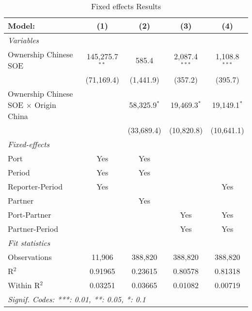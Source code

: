 \begin{table}[htbp]    \caption{Fixed effects Results}    \centering    \begin{adjustbox}{width = \textwidth, center}       \begin{tabular}{lcccc}          \tabularnewline \midrule \midrule          Model:                                       & (1)              & (2)            & (3)             & (4)\\            \midrule          \emph{Variables}\\          Ownership Chinese SOE                        & 145,275.7$^{**}$ & 585.4          & 2,087.4$^{***}$ & 1,108.8$^{***}$\\                                                          & (71,169.4)       & (1,441.9)      & (357.2)         & (395.7)\\             Ownership Chinese SOE $\times$ Origin China  &                  & 58,325.9$^{*}$ & 19,469.3$^{*}$  & 19,149.1$^{*}$\\                                                          &                  & (33,689.4)     & (10,820.8)      & (10,641.1)\\             \midrule          \emph{Fixed-effects}\\          Port                                         & Yes              & Yes            &                 & \\            Period                                       & Yes              & Yes            &                 & \\            Reporter-Period                              & Yes              &                &                 & Yes\\            Partner                                      &                  & Yes            &                 & \\            Port-Partner                                 &                  &                & Yes             & Yes\\            Partner-Period                               &                  &                & Yes             & Yes\\            \midrule          \emph{Fit statistics}\\          Observations                                 & 11,906           & 388,820        & 388,820         & 388,820\\            R$^2$                                        & 0.91965          & 0.23615        & 0.80578         & 0.81318\\            Within R$^2$                                 & 0.03251          & 0.03665        & 0.01082         & 0.00719\\            \midrule \midrule          \multicolumn{5}{l}{\emph{Signif. Codes: ***: 0.01, **: 0.05, *: 0.1}}\\       \end{tabular}    \end{adjustbox} \end{table}